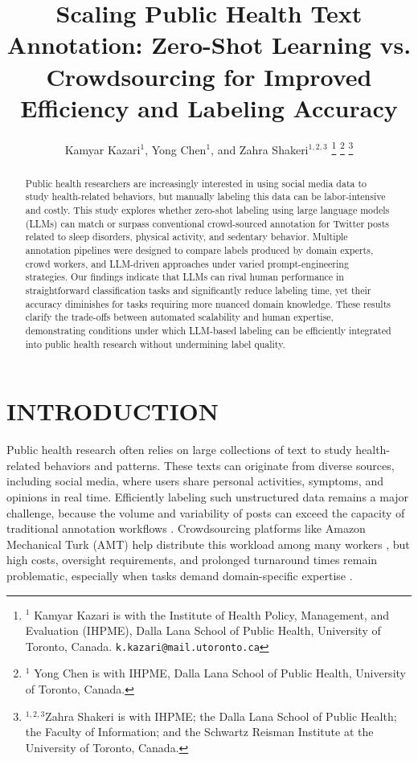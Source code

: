 \documentclass[letterpaper, 10 pt, conference]{ieeeconf} %
\title{
Scaling Public Health Text Annotation: Zero-Shot Learning vs. Crowdsourcing for Improved Efficiency and Labeling Accuracy
}
\author{Kamyar Kazari$^{1}$, Yong Chen$^{1}$, and Zahra Shakeri$^{1,2,3}$
    \thanks{$^{1}$ Kamyar Kazari is with the Institute of Health Policy, Management, and Evaluation (IHPME), Dalla Lana School of Public Health, University of Toronto, Canada. 
      {\tt\small k.kazari@mail.utoronto.ca}}%
    \thanks{$^{1}$ Yong Chen is with IHPME, Dalla Lana School of Public Health, University of Toronto, Canada.} %
\thanks{$^{1,2,3}$Zahra Shakeri is with IHPME; the Dalla Lana School of Public Health; the Faculty of Information; and the Schwartz Reisman Institute at the University of Toronto, Canada. 
    {\tt\small}}%
}
\begin{document}
\maketitle
\thispagestyle{empty}
\pagestyle{empty}


\begin{abstract}


Public health researchers are increasingly interested in using social media data to study health-related behaviors, but manually labeling this data can be labor-intensive and costly. This study explores whether zero-shot labeling using large language models (LLMs) can match or surpass conventional crowd-sourced annotation for Twitter posts related to sleep disorders, physical activity, and sedentary behavior. Multiple annotation pipelines were designed to compare labels produced by domain experts, crowd workers, and LLM-driven approaches under varied prompt-engineering strategies. Our findings indicate that LLMs can rival human performance in straightforward classification tasks and significantly reduce labeling time, yet their accuracy diminishes for tasks requiring more nuanced domain knowledge. These results clarify the trade-offs between automated scalability and human expertise, demonstrating conditions under which LLM-based labeling can be efficiently integrated into public health research without undermining label quality.


\end{abstract}



\vspace{-1mm}
\section{INTRODUCTION}


Public health research often relies on large collections of text to study health-related behaviors and patterns. These texts can originate from diverse sources, including social media, where users share personal activities, symptoms, and opinions in real time. Efficiently labeling such unstructured data remains a major challenge, because the volume and variability of posts can exceed the capacity of traditional annotation workflows \cite{DAR2024112526}. Crowdsourcing platforms like Amazon Mechanical Turk (AMT) help distribute this workload among many workers \cite{shakeri2022crowdsourcing}, but high costs, oversight requirements, and prolonged turnaround times remain problematic, especially when tasks demand domain-specific expertise \cite{marshall2023broke,karpinska2021perils}.
 
\end{document}
